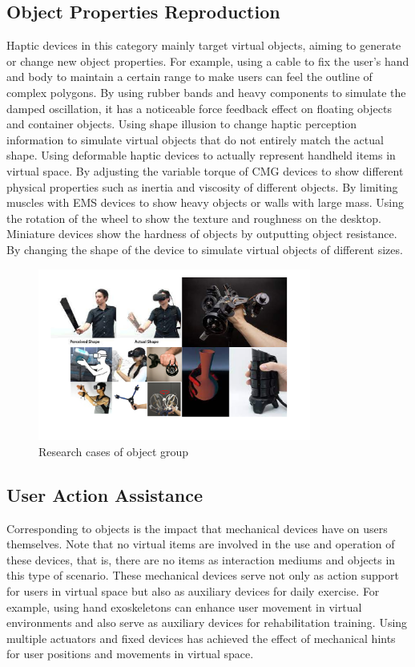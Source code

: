 \subsection{Object Properties Reproduction}
Haptic devices in this category mainly target virtual objects, aiming to generate or change new object properties. For example, using a cable to fix the user's hand and body to maintain a certain range to make users can feel the outline of complex polygons\cite{ref_003}. By using rubber bands and heavy components to simulate the damped oscillation\cite{ref_006}, it has a noticeable force feedback effect on floating objects and container objects. Using shape illusion to change haptic perception information to simulate virtual objects that do not entirely match the actual shape\cite{ref_012}. Using deformable haptic devices to actually represent handheld items in virtual space\cite{ref_013}. By adjusting the variable torque of CMG devices to show different physical properties such as inertia and viscosity of different objects\cite{ref_017}. By limiting muscles with EMS devices to show heavy objects or walls with large mass\cite{ref_EMS003}. Using the rotation of the wheel to show the texture and roughness on the desktop\cite{ref_MR001}. Miniature devices show the hardness of objects by outputting object resistance\cite{ref_MR004}. By changing the shape of the device to simulate virtual objects of different sizes\cite{ref_MR005}.

\begin{figure}[h]
\centering
\includegraphics[width=0.8\textwidth]{A_thesis/figures/007.png}
\caption{Research cases of object group}
\end{figure}

\subsection{User Action Assistance}
Corresponding to objects is the impact that mechanical devices have on users themselves. Note that no virtual items are involved in the use and operation of these devices, that is, there are no items as interaction mediums and objects in this type of scenario. These mechanical devices serve not only as action support for users in virtual space but also as auxiliary devices for daily exercise. For example, using hand exoskeletons can enhance user movement in virtual environments and also serve as auxiliary devices for rehabilitation training\cite{ref_002}. Using multiple actuators and fixed devices has achieved the effect of mechanical hints for user positions and movements in virtual space\cite{ref_010}.

